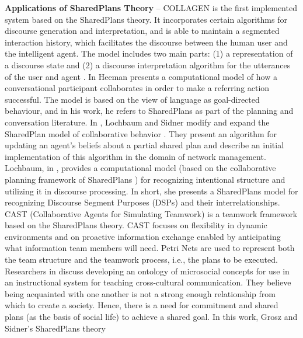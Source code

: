 \documentclass[12pt]{report}
\begin{document}
\textbf{Applications of SharedPlans Theory} -- COLLAGEN
\cite{rich:collaboration-manager, rich:discourse} is the first implemented
system based on the SharedPlans theory. It incorporates certain algorithms for
discourse generation and interpretation, and is able to maintain a segmented
interaction history, which facilitates the discourse between the human user and
the intelligent agent. The model includes two main parts: (1) a representation of
a discourse state and (2) a discourse interpretation algorithm for the
utterances of the user and agent \cite{rickel:discourse-theory-dialogue}. In
\cite{heeman:model-collaboration-referring} Heeman presents a computational
model of how a conversational participant collaborates in order to make a
referring action successful. The model is based on the view of language as
goal-directed behaviour, and in his work, he refers to SharedPlans as part of
the planning and conversation literature. In \cite{lochbaum:plan-models},
Lochbaum and Sidner modify and expand the SharedPlan model of collaborative
behavior \cite{grosz:plans-discourse}. They present an algorithm for updating an
agent’s beliefs about a partial shared plan and describe an initial
implementation of this algorithm in the domain of network management. Lochbaum,
in \cite{lochbaum:collaborative-planning}, provides a computational model
(based on the collaborative planning framework of SharedPlans
\cite{grosz:collaboration}) for recognizing intentional structure and utilizing
it in discourse processing. In short, she presents a SharedPlans model for
recognizing Discourse Segment Purposes (DSPs) \cite{grosz:plans-discourse}
\cite{sidner:discourse-collaborative-negotiation} and their interrelationships.
CAST (Collaborative Agents for Simulating Teamwork) \cite{yen:cast}
\cite{yin:knowledge-based-sharedplans} is a teamwork framework based on the
SharedPlans theory. CAST focuses on flexibility in dynamic environments and on
proactive information exchange enabled by anticipating what information team
members will need. Petri Nets are used to represent both the team structure and
the teamwork process, i.e., the plans to be executed. Researchers in
\cite{hobbs:microsociology-relationship} discuss developing an ontology of
microsocial concepts for use in an instructional system for teaching
cross-cultural communication. They believe being acquainted with one another is
not a strong enough relationship from which to create a society. Hence, there is
a need for commitment and shared plans (as the basis of social life) to achieve
a shared goal. In this work, Grosz and Sidner's SharedPlans theory
\end{document}
